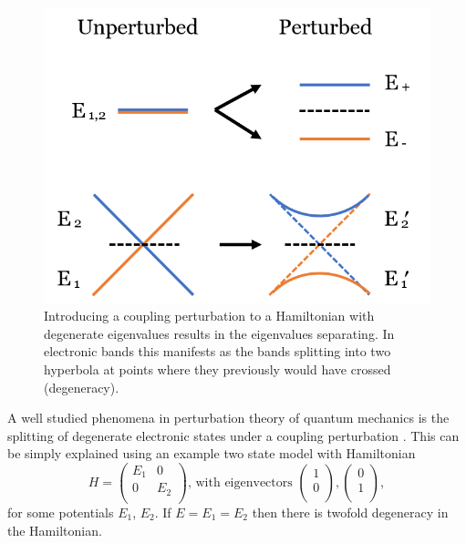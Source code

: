 \documentclass[12pt]{report} %
\begin{document}
\begin{figure}[t!]
\centering
\includegraphics[width=0.6\columnwidth]{splitting_bands_diagram.png}
  \caption{Introducing a coupling perturbation to a Hamiltonian with degenerate eigenvalues results in the eigenvalues separating. In electronic bands this manifests as the bands splitting into two hyperbola at points where they previously would have crossed (degeneracy).}
  \label{splitting_bands}
\end{figure}
%
A well studied phenomena in perturbation theory of quantum mechanics is the splitting of degenerate electronic states under a coupling perturbation \cite{Verhoeven1996, Cohen-Tannoudji2006}. This can be simply explained using an example two state model with Hamiltonian
%
\begin{equation}
  H = \begin{pmatrix}
        E_1 & 0 \\
        0 & E_2 \\
      \end{pmatrix}
      \text{, with eigenvectors }
      \begin{pmatrix}
        1\\
        0\\
      \end{pmatrix},
      \begin{pmatrix}
        0\\
        1\\
      \end{pmatrix},
\end{equation}
%
for some potentials $E_1$, $E_2$. If $E = E_1 = E_2$ then there is twofold degeneracy in the Hamiltonian.
\end{document}
